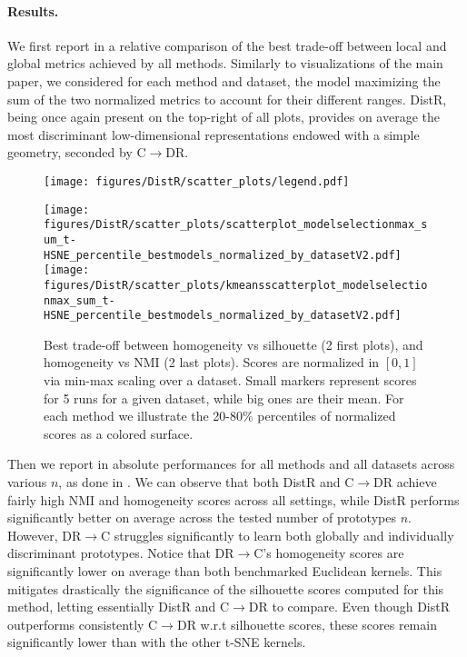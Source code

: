 \paragraph{Results.} We first report in  a relative comparison of the best trade-off between local and global metrics achieved by all methods. Similarly to visualizations of the main paper, we considered for each method and dataset, the model maximizing the sum of the two normalized metrics to account for their different ranges. DistR, being once again present on the top-right of all plots, provides on average the most discriminant
low-dimensional representations endowed with a simple geometry, seconded by
C$\rightarrow$DR. 

\begin{figure*}[h!]
	\begin{center}
		\centerline{\texttt{[image: figures/DistR/scatter\_plots/legend.pdf]}}\vspace{-1mm}
		\centerline{
			\texttt{[image: figures/DistR/scatter\_plots/scatterplot\_modelselectionmax\_sum\_t-HSNE\_percentile\_bestmodels\_normalized\_by\_datasetV2.pdf]}
			\texttt{[image: figures/DistR/scatter\_plots/kmeansscatterplot\_modelselectionmax\_sum\_t-HSNE\_percentile\_bestmodels\_normalized\_by\_datasetV2.pdf]}
		}
		\caption{Best trade-off between homogeneity vs silhouette (2 first plots), and homogeneity vs NMI (2 last plots). Scores are normalized in $\left[0, 1\right]$ via min-max scaling over a dataset. Small markers represent scores for 5 runs for a given dataset, while big ones are their mean. For each method we illustrate the 20-80\% percentiles of normalized scores as a colored surface.
		}
		\vspace{-0.5cm}
		\label{fig:trade_off_hyp}
	\end{center}
	\vspace{-0.3cm}
\end{figure*}

Then we report in  absolute performances for all methods and all datasets across various $n$, as done in . We can observe that both DistR and C$\rightarrow$DR achieve fairly high NMI and homogeneity scores across all settings, while DistR performs significantly better on average across the tested number of prototypes $n$.  However, DR$\rightarrow$C struggles significantly to learn both globally and individually discriminant prototypes. Notice that DR$\rightarrow$C's homogeneity scores are significantly lower on average than both benchmarked Euclidean kernels. This mitigates drastically the significance of the silhouette scores computed for this method, letting essentially DistR and C$\rightarrow$DR to compare. Even though DistR outperforms consistently C$\rightarrow$DR w.r.t silhouette scores, these scores remain significantly lower than with the other t-SNE kernels. 

